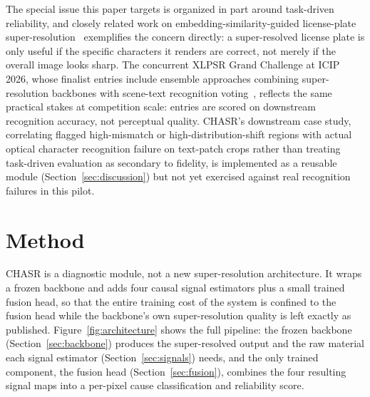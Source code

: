 \documentclass[review]{elsarticle}
\begin{document}
The special issue this paper targets is organized in part around task-driven reliability, and closely related work on embedding-similarity-guided license-plate super-resolution~\citep{sendjasni2025licenseplate} exemplifies the concern directly: a super-resolved license plate is only useful if the specific characters it renders are correct, not merely if the overall image looks sharp. The concurrent XLPSR Grand Challenge at ICIP 2026, whose finalist entries include ensemble approaches combining super-resolution backbones with scene-text recognition voting~\citep{krishnan2026xlpsr}, reflects the same practical stakes at competition scale: entries are scored on downstream recognition accuracy, not perceptual quality. CHASR's downstream case study, correlating flagged high-mismatch or high-distribution-shift regions with actual optical character recognition failure on text-patch crops rather than treating task-driven evaluation as secondary to fidelity, is implemented as a reusable module (Section~\ref{sec:discussion}) but not yet exercised against real recognition failures in this pilot.

\FloatBarrier
\section{Method}
\label{sec:method}

CHASR is a diagnostic module, not a new super-resolution architecture. It wraps a frozen backbone and adds four causal signal estimators plus a small trained fusion head, so that the entire training cost of the system is confined to the fusion head while the backbone's own super-resolution quality is left exactly as published. Figure~\ref{fig:architecture} shows the full pipeline: the frozen backbone (Section~\ref{sec:backbone}) produces the super-resolved output and the raw material each signal estimator (Section~\ref{sec:signals}) needs, and the only trained component, the fusion head (Section~\ref{sec:fusion}), combines the four resulting signal maps into a per-pixel cause classification and reliability score.
\end{document}

